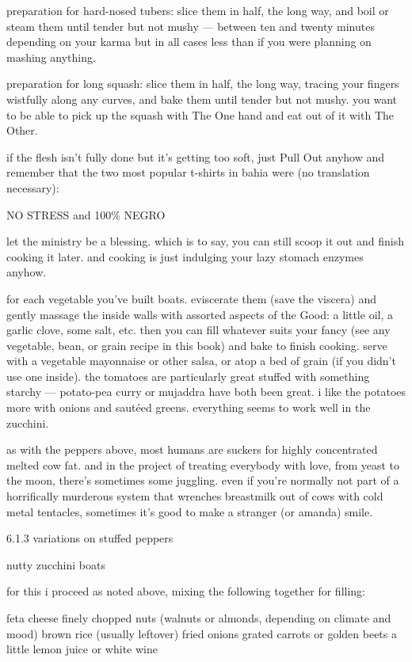 preparation for hard-nosed tubers:
	slice them in half, the long way, and boil or steam them until tender but not mushy --- between ten and twenty minutes depending on your karma but in all cases less than if you were planning on mashing anything.

preparation for long squash:
	slice them in half, the long way, tracing your fingers wistfully along any curves, and bake them until tender but not mushy. you want to be able to pick up the squash with The One hand and eat out of it with The Other.


if the flesh isn't fully done but it's getting too soft, just Pull Out anyhow and remember that the two most popular t-shirts in bahia were (no translation necessary):

		NO STRESS
	and
		100\% NEGRO

let the ministry be a blessing. which is to say, you can still scoop it out and finish cooking it later. and cooking is just indulging your lazy stomach enzymes anyhow. 

for each vegetable you've built boats. eviscerate them (save the viscera) and gently massage the inside walls with assorted aspects of the Good: a little oil, a garlic clove, some salt, etc. then you can fill whatever suits your fancy (see any vegetable, bean, or grain recipe in this book) and bake to finish cooking. serve with a vegetable mayonnaise or other salsa, or atop a bed of grain (if you didn't use one inside).
the tomatoes are particularly great stuffed with something starchy --- potato-pea curry or mujaddra have both been great. i like the potatoes more with onions and saut\'{e}ed greens. everything seems to work well in the zucchini.

	as with the peppers above, most humans are suckers for highly concentrated melted cow fat. and in the project of treating everybody with love, from yeast to the moon, there's sometimes some juggling. even if you're normally not part of a horrifically murderous system that wrenches breastmilk out of cows with cold metal tentacles, sometimes it's good to make a stranger (or amanda) smile.

6.1.3  variations on stuffed peppers

nutty zucchini boats

for this i proceed as noted above, mixing the following together for filling:

feta cheese
finely chopped nuts (walnuts or almonds, depending on climate and mood)
brown rice (usually leftover)
fried onions
grated carrots or golden beets
a little lemon juice or white wine

